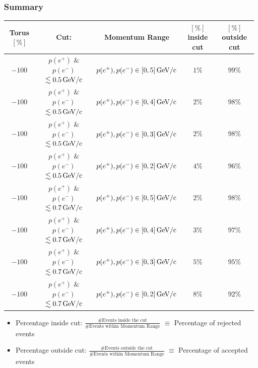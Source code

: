 \documentclass[xcolor=table, xcolor=dvipsnames]{beamer}
\begin{document}
\begin{frame}
        \frametitle{Summary}

        \tiny
        \begin{table}
          \begin{tabular}{|c||c||c||c||c|}
             \hline
               Torus $[\%]$ & Cut: &  Momentum Range & $[\%]$ inside cut  & $[\%]$ outside cut \\
               \hline
               \hline
               $-100$ & $p(e^+)$ $\&$ $p(e^-)$ $ \lesssim 0.5\,\rm{GeV/c}$ & $p(e^+),p(e^-) \in [0,5] \,\rm{GeV/c}$  & $1\%$ & $99\%$\\
               \hline
                $-100$ & $p(e^+)$ $\&$ $p(e^-)$ $ \lesssim 0.5\,\rm{GeV/c}$ & $p(e^+),p(e^-) \in [0,4] \,\rm{GeV/c}$  & $2\%$ & $98\%$\\
                \hline
                 $-100$ & $p(e^+)$ $\&$ $p(e^-)$ $ \lesssim 0.5\,\rm{GeV/c}$ & $p(e^+),p(e^-) \in [0,3] \,\rm{GeV/c}$  & $2\%$ & $98\%$\\
                \hline
               $-100$ & $p(e^+)$ $\&$ $p(e^-)$ $ \lesssim 0.5\,\rm{GeV/c}$ & $p(e^+),p(e^-) \in [0,2] \,\rm{GeV/c}$  & $4\%$ & $96\%$\\
                \hline
                \hline
               $-100$ & $p(e^+)$ $\&$ $p(e^-)$ $ \lesssim 0.7\,\rm{GeV/c}$ & $p(e^+),p(e^-) \in [0,5] \,\rm{GeV/c}$  & $2\%$ & $98\%$\\
               \hline
                $-100$ & $p(e^+)$ $\&$ $p(e^-)$ $ \lesssim 0.7\,\rm{GeV/c}$ & $p(e^+),p(e^-) \in [0,4] \,\rm{GeV/c}$  & $3\%$ & $97\%$\\
                \hline
                 $-100$ & $p(e^+)$ $\&$ $p(e^-)$ $ \lesssim 0.7\,\rm{GeV/c}$ & $p(e^+),p(e^-) \in [0,3] \,\rm{GeV/c}$  & $5\%$ & $95\%$\\
                \hline
               $-100$ & $p(e^+)$ $\&$ $p(e^-)$ $ \lesssim 0.7\,\rm{GeV/c}$ & $p(e^+),p(e^-) \in [0,2] \,\rm{GeV/c}$  & $8\%$ & $92\%$\\
               \hline
               \hline
          \end{tabular}
        \end{table}
        
        \begin{itemize}
          \item Percentage inside cut: $\frac{\# \text{Events inside the cut}}{\# \text{Events within Momentum Range}}$ $\equiv$ Percentage of rejected events
           \item Percentage outside cut: $\frac{\# \text{Events outside the cut}}{\# \text{Events within Momentum Range}}$ $\equiv$ Percentage of accepted events
        \end{itemize}
\end{frame}
              
\end{document}
